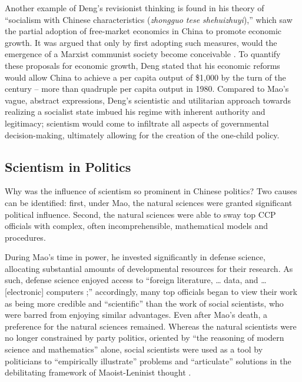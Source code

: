 \documentclass[12pt, a4paper, twoside]{article}
\begin{document}
Another example of Deng’s revisionist thinking is found in his theory of “socialism with Chinese characteristics (\emph{zhongguo tese shehuizhuyi}),” which saw the partial adoption of free-market economics in China to promote economic growth. It was argued that only by first adopting such measures, would the emergence of a Marxist communist society become conceivable \autocite{Fengqi2021DengRichFirst}. To quantify these proposals for economic growth, Deng stated that his economic reforms would allow China to achieve a per capita output of \$1,000 by the turn of the century – more than quadruple per capita output in 1980. Compared to Mao’s vague, abstract expressions, Deng’s scientistic and utilitarian approach towards realizing a socialist state imbued his regime with inherent authority and legitimacy; scientism would come to infiltrate all aspects of governmental decision-making, ultimately allowing for the creation of the one-child policy.

\subsection{Scientism in Politics}

Why was the influence of scientism so prominent in Chinese politics? Two causes can be identified: first, under Mao, the natural sciences were granted significant political influence. Second, the natural sciences were able to sway top CCP officials with complex, often incomprehensible, mathematical models and procedures.

During Mao’s time in power, he invested significantly in defense science, allocating substantial amounts of developmental resources for their research. As such, defense science enjoyed access to “foreign literature, … data, and … [electronic] computers \autocite[p.\ 139]{Greenhalgh2008JustOneChild};” accordingly, many top officials began to view their work as being more credible and “scientific” than the work of social scientists, who were barred from enjoying similar advantages. Even after Mao’s death, a preference for the natural sciences remained. Whereas the natural scientists were no longer constrained by party politics, oriented by “the reasoning of modern science and mathematics” alone, social scientists were used as a tool by politicians to “empirically illustrate” problems and “articulate” solutions in the debilitating framework of Maoist-Leninist thought \autocite[p.\ 84]{Greenhalgh2008JustOneChild}.
\end{document}
